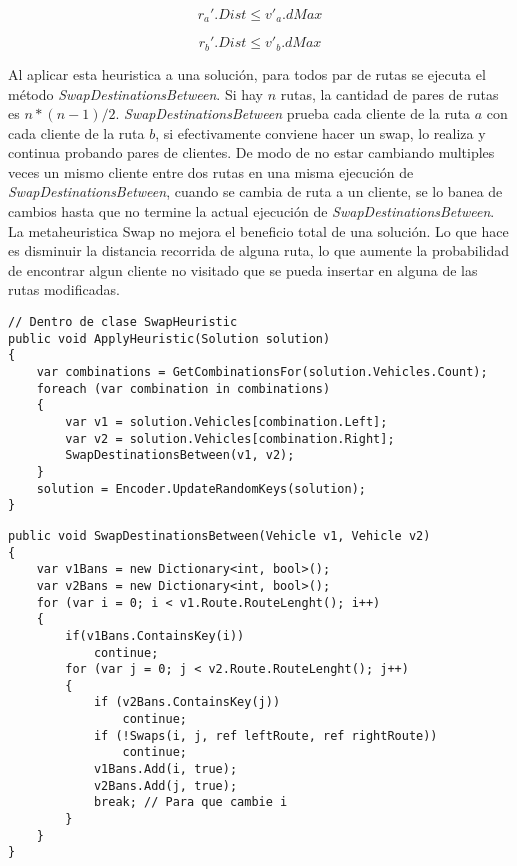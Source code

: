 \begin{equation*}
r_a'.Dist \leq v'_a.dMax
\end{equation*}

\begin{equation*}
r_b'.Dist \leq v'_b.dMax
\end{equation*}

Al aplicar esta heuristica a una solución, para todos par de rutas se ejecuta el método \textit{SwapDestinationsBetween}. Si hay $n$ rutas, la cantidad de pares de rutas es $n * (n-1) / 2$. \textit{SwapDestinationsBetween} prueba cada cliente de la ruta $a$ con cada cliente de la ruta $b$, si efectivamente conviene hacer un swap, lo realiza y continua probando pares de clientes. De modo de no estar cambiando multiples veces un mismo cliente entre dos rutas en una misma ejecución de \textit{SwapDestinationsBetween}, cuando se cambia de ruta a un cliente, se lo banea de cambios hasta que no termine la actual ejecución de \textit{SwapDestinationsBetween}. La metaheuristica Swap no mejora el beneficio total de una solución. Lo que hace es disminuir la distancia recorrida de alguna ruta, lo que aumente la probabilidad de encontrar algun cliente no visitado que se pueda insertar en alguna de las rutas modificadas.

\bigskip

\begin{minipage}{\textwidth}
\begin{lstlisting}
// Dentro de clase SwapHeuristic
public void ApplyHeuristic(Solution solution)
{
	var combinations = GetCombinationsFor(solution.Vehicles.Count);
	foreach (var combination in combinations)
	{
		var v1 = solution.Vehicles[combination.Left];
		var v2 = solution.Vehicles[combination.Right];
		SwapDestinationsBetween(v1, v2);
	}
	solution = Encoder.UpdateRandomKeys(solution);
}
\end{lstlisting}
\end{minipage}

\begin{minipage}{\textwidth}
\begin{lstlisting}
public void SwapDestinationsBetween(Vehicle v1, Vehicle v2)
{
	var v1Bans = new Dictionary<int, bool>();
	var v2Bans = new Dictionary<int, bool>();
	for (var i = 0; i < v1.Route.RouteLenght(); i++)
	{
		if(v1Bans.ContainsKey(i)) 
			continue;
		for (var j = 0; j < v2.Route.RouteLenght(); j++)
		{
			if (v2Bans.ContainsKey(j)) 
				continue;
			if (!Swaps(i, j, ref leftRoute, ref rightRoute)) 
				continue;
			v1Bans.Add(i, true);
			v2Bans.Add(j, true);
			break; // Para que cambie i
		}
	}
}
\end{lstlisting}
\end{minipage}

